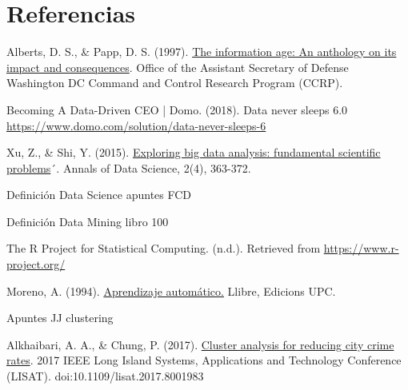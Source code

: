 \documentclass[3p,twocolumn]{elsarticle}
\begin{document}



\clearpage

\section{Referencias}
\renewcommand{\section}[2]{}
\begin{thebibliography}{X}

 Alberts, D. S., \& Papp, D. S. (1997). \href{http://www.dodccrp.org/files/Alberts_Anthology_I.pdf} {The information age: An anthology on its impact and consequences}. Office of the Assistant Secretary of Defense Washington DC Command and Control Research Program (CCRP).

 Becoming A Data-Driven CEO | Domo. (2018). Data never sleeps 6.0 \href{https://www.domo.com/solution/data-never-sleeps-6} {https://www.domo.com/solution/data-never-sleeps-6}

 Xu, Z., \& Shi, Y. (2015). \href {https://link.springer.com/content/pdf/10.1007/s40745-015-0063-7.pdf} {Exploring big data analysis: fundamental scientific problems}´. Annals of Data Science, 2(4), 363-372.

 Definición Data Science apuntes FCD

 Definición Data Mining libro 100

 The R Project for Statistical Computing. (n.d.). Retrieved from \href{https://www.r-project.org/} {https://www.r-project.org/}

 Moreno, A. (1994). \href{https://upcommons.upc.edu/bitstream/handle/2099.3/36157/9788483019962.pdf?sequence=1&isAllowed=y} {Aprendizaje automático.} Llibre, Edicions UPC.

 Apuntes JJ clustering

 Alkhaibari, A. A., \& Chung, P. (2017). \href{https://ieeexplore.ieee.org/document/8001983} {Cluster analysis for reducing city crime rates}. 2017 IEEE Long Island Systems, Applications and Technology Conference (LISAT). doi:10.1109/lisat.2017.8001983


\end{thebibliography}
\end{document}
